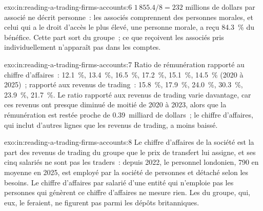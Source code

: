 \begin{solution}{exo:in:reading-a-trading-firms-accounts:6}
$1\,855.4/8=232$ millions de dollars par associé ne décrit personne~: les associés comprennent des personnes morales, et celui qui a le
droit d'accès le plus élevé, une personne morale, a reçu 84.3~\% du bénéfice. Cette part sort du groupe~; ce que reçoivent les
associés pris individuellement n'apparaît pas dans les comptes.
\end{solution}

\begin{solution}{exo:in:reading-a-trading-firms-accounts:7}
Ratio de rémunération rapporté au chiffre d'affaires~: 12.1~\%, 13.4~\%, 16.5~\%, 17.2~\%, 15.1~\%, 14.5~\% (2020 à 2025)~; rapporté aux revenus de trading~: 15.8~\%,
17.9~\%, 24.0~\%, 30.3~\%, 23.9~\%, 21.7~\%. Le ratio rapporté aux revenus de trading varie davantage, car ces revenus ont presque diminué de
moitié de 2020 à 2023, alors que la rémunération est restée proche de 0.39~milliard de dollars~; le chiffre d'affaires, qui inclut d'autres
lignes que les revenus de trading, a moins baissé.
\end{solution}

\begin{solution}{exo:in:reading-a-trading-firms-accounts:8}
Le chiffre d'affaires de la société est la part des revenus de trading du groupe que le prix de transfert lui assigne, et ses cinq salariés
ne sont pas les traders~: depuis 2022, le personnel londonien, 790 en moyenne en 2025, est employé par la société de personnes et détaché
selon les besoins. Le chiffre d'affaires par salarié d'une entité qui n'emploie pas les personnes qui génèrent ce chiffre d'affaires ne mesure rien.
Les  du groupe, qui, eux, le feraient, ne figurent pas parmi les dépôts britanniques.
\end{solution}


